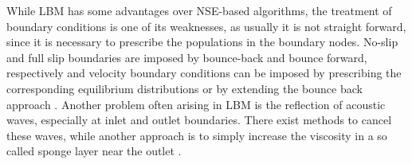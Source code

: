 While LBM has some advantages over NSE-based algorithms, the treatment of boundary conditions is one of its weaknesses, as usually it is not straight forward, since it is necessary to prescribe the populations in the boundary nodes. No-slip and full slip boundaries are imposed by bounce-back and bounce forward, respectively and velocity boundary conditions can be imposed by prescribing the corresponding equilibrium distributions or by extending the bounce back approach \cite[p. 175 - 189, 199 - 207]{kruger_lattice_2017}. Another problem often arising in LBM is the reflection of acoustic waves, especially at inlet and outlet boundaries. There exist methods to cancel these waves, while another approach is to simply increase the viscosity in a so called sponge layer near the outlet \cite[p. 522 - 526]{kruger_lattice_2017}.